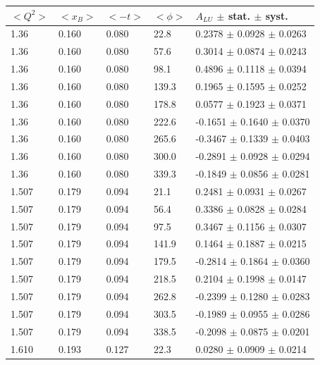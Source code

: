 \documentclass{article}
\begin{document}
\begin{table}[!h]
   \begin{center}
      \begin{tabular}{||l|l|l|l|l||}
         \hline
 $<Q^{2}>$ & $<x_{B}>$ & $<-t>$ & $<\phi>$ & $A_{LU}$ $\pm$ stat. $\pm$ syst.\\
  \hline
  1.36 & 0.160 & 0.080  & 22.8  &  0.2378 $\pm$ 0.0928 $\pm$ 0.0263 \\
  1.36 & 0.160 & 0.080  & 57.6  &  0.3014 $\pm$ 0.0874 $\pm$ 0.0243 \\
  1.36 & 0.160 & 0.080  & 98.1  &  0.4896 $\pm$ 0.1118 $\pm$ 0.0394 \\
  1.36 & 0.160 & 0.080  & 139.3 &  0.1965 $\pm$ 0.1595 $\pm$ 0.0252 \\
  1.36 & 0.160 & 0.080  & 178.8 &  0.0577 $\pm$ 0.1923 $\pm$ 0.0371 \\
  1.36 & 0.160 & 0.080  & 222.6 & -0.1651 $\pm$ 0.1640 $\pm$ 0.0370 \\
  1.36 & 0.160 & 0.080  & 265.6 & -0.3467 $\pm$ 0.1339 $\pm$ 0.0403 \\
  1.36 & 0.160 & 0.080  & 300.0 & -0.2891 $\pm$ 0.0928 $\pm$ 0.0294 \\
  1.36 & 0.160 & 0.080  & 339.3 & -0.1849 $\pm$ 0.0856 $\pm$ 0.0281 \\
  \hline                                                                
  1.507 & 0.179 & 0.094 & 21.1  &  0.2481 $\pm$ 0.0931 $\pm$ 0.0267 \\ 
  1.507 & 0.179 & 0.094 & 56.4  &  0.3386 $\pm$ 0.0828 $\pm$ 0.0284 \\ 
  1.507 & 0.179 & 0.094 & 97.5  &  0.3467 $\pm$ 0.1156 $\pm$ 0.0307 \\ 
  1.507 & 0.179 & 0.094 & 141.9 &  0.1464 $\pm$ 0.1887 $\pm$ 0.0215 \\ 
  1.507 & 0.179 & 0.094 & 179.5 & -0.2814 $\pm$ 0.1864 $\pm$ 0.0360 \\ 
  1.507 & 0.179 & 0.094 & 218.5 &  0.2104 $\pm$ 0.1998 $\pm$ 0.0147 \\ 
  1.507 & 0.179 & 0.094 & 262.8 & -0.2399 $\pm$ 0.1280 $\pm$ 0.0283 \\ 
  1.507 & 0.179 & 0.094 & 303.5 & -0.1989 $\pm$ 0.0955 $\pm$ 0.0286 \\ 
  1.507 & 0.179 & 0.094 & 338.5 & -0.2098 $\pm$ 0.0875 $\pm$ 0.0201 \\ 
  \hline                                                                                                                 
  1.610 & 0.193 & 0.127 & 22.3  &  0.0280 $\pm$ 0.0909 $\pm$ 0.0214 \\

\end{tabular}
\end{center}
\end{table}
\end{document}
